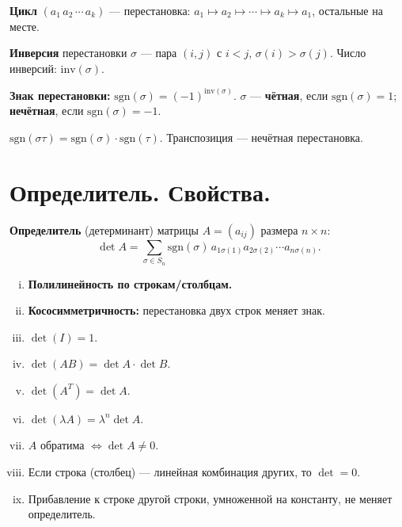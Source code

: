\documentclass[12pt]{article}
\begin{document}
\begin{definition}
\textbf{Цикл} $(a_1\, a_2\,\cdots\, a_k)$ --- перестановка:
$a_1 \mapsto a_2 \mapsto \cdots \mapsto a_k \mapsto a_1$,
остальные на месте.
\end{definition}

\begin{definition}
\textbf{Инверсия} перестановки $\sigma$ --- пара $(i,j)$ с $i < j$,
$\sigma(i) > \sigma(j)$.
Число инверсий: $\mathrm{inv}(\sigma)$.
\end{definition}

\begin{definition}
\textbf{Знак перестановки:}
$\mathrm{sgn}(\sigma) = (-1)^{\mathrm{inv}(\sigma)}$.
$\sigma$ --- \textbf{чётная}, если $\mathrm{sgn}(\sigma) = 1$;
\textbf{нечётная}, если $\mathrm{sgn}(\sigma) = -1$.
\end{definition}

\begin{property}
$\mathrm{sgn}(\sigma\tau) = \mathrm{sgn}(\sigma)\cdot\mathrm{sgn}(\tau)$.
Транспозиция --- нечётная перестановка.
\end{property}

\section{Определитель. Свойства.}

\begin{definition}
\textbf{Определитель} (детерминант) матрицы $A = (a_{ij})$ размера $n\times n$:
\[
\det A = \sum_{\sigma \in S_n} \mathrm{sgn}(\sigma)\,
a_{1\sigma(1)} a_{2\sigma(2)} \cdots a_{n\sigma(n)}.
\]
\end{definition}

\begin{property}
\begin{enumerate}[(i)]
\item \textbf{Полилинейность по строкам/столбцам.}
\item \textbf{Кососимметричность:} перестановка двух строк меняет знак.
\item $\det(I) = 1$.
\item $\det(AB) = \det A \cdot \det B$.
\item $\det(A^T) = \det A$.
\item $\det(\lambda A) = \lambda^n \det A$.
\item $A$ обратима $\iff \det A \neq 0$.
\item Если строка (столбец) --- линейная комбинация других, то $\det = 0$.
\item Прибавление к строке другой строки, умноженной на константу,
      не меняет определитель.
\end{enumerate}
\end{property}
\end{document}
